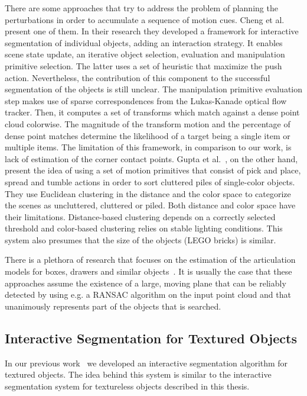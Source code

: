 There are some approaches that try to address the problem of planning the perturbations in order to accumulate a sequence of motion cues. Cheng et al.~\cite{chang11interactive} present one of them. In their research they developed a framework for interactive segmentation of individual objects, adding an interaction strategy. It enables scene state update, an iterative object selection, evaluation and manipulation primitive selection. The latter uses a set of heuristic that maximize the push action. Nevertheless, the contribution of this component to the successful segmentation of the objects is still unclear. The manipulation primitive evaluation step makes use of sparse correspondences from the Lukas-Kanade optical flow tracker. Then, it computes a set of transforms which match against a dense point cloud colorwise. The magnitude of the transform motion and the percentage of dense point matches determine the likelihood of a target being a single item or multiple items. The limitation of this framework, in comparison to our work, is lack of estimation of the corner contact points.
Gupta et al.~\cite{gupta11primitives}, on the other hand, present the idea of using a set of motion primitives that consist of pick and place, spread and tumble actions in order to sort cluttered piles of single-color objects. They use Euclidean clustering in the distance and the color space to categorize the scenes as uncluttered, cluttered or piled. Both distance and color space have their limitations. Distance-based clustering depends on a correctly selected threshold and color-based clustering relies on stable lighting conditions. This system also presumes that the size of the objects (LEGO bricks) is similar. 

There is a plethora of research that focuses on the estimation of the articulation models for boxes, drawers and similar objects~\cite{Box11Saxena,
  sturm10rss-workshop}. It is usually the case that these approaches assume the existence of a large, moving plane that can be reliably detected by using e.g. a RANSAC algorithm on the input point cloud and that  unanimously represents part of the objects that is searched.


\subsection{Interactive Segmentation for Textured Objects}
In our previous work~\cite{polishthesis,bersch12interactive} we developed an interactive segmentation algorithm for textured objects. The idea behind this system is similar to the interactive segmentation system for textureless objects described in this thesis.

